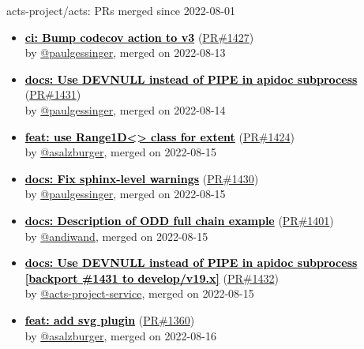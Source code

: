 \documentclass{beamer}
\begin{document}
\begin{frame}[allowframebreaks]{ acts-project/acts: PRs merged since 2022-08-01 }
\begin{itemize}
    \item
    \textbf{\href{https://github.com/acts-project/acts/pull/1427}{\textcolor{black}{ci: Bump codecov action to v3}}}
    (\href{https://github.com/acts-project/acts/pull/1427}{PR\#1427}) \\
    by \href{https://github.com/paulgessinger}{ @paulgessinger}, merged on 2022-08-13

    \item
    \textbf{\href{https://github.com/acts-project/acts/pull/1431}{\textcolor{black}{docs: Use DEVNULL instead of PIPE in apidoc subprocess}}}
    (\href{https://github.com/acts-project/acts/pull/1431}{PR\#1431}) \\
    by \href{https://github.com/paulgessinger}{ @paulgessinger}, merged on 2022-08-14

    \item
    \textbf{\href{https://github.com/acts-project/acts/pull/1424}{\textcolor{black}{feat: use Range1D<> class for extent}}}
    (\href{https://github.com/acts-project/acts/pull/1424}{PR\#1424}) \\
    by \href{https://github.com/asalzburger}{ @asalzburger}, merged on 2022-08-15

    \item
    \textbf{\href{https://github.com/acts-project/acts/pull/1430}{\textcolor{black}{docs: Fix sphinx-level warnings}}}
    (\href{https://github.com/acts-project/acts/pull/1430}{PR\#1430}) \\
    by \href{https://github.com/paulgessinger}{ @paulgessinger}, merged on 2022-08-15

    \item
    \textbf{\href{https://github.com/acts-project/acts/pull/1401}{\textcolor{black}{docs: Description of ODD full chain example}}}
    (\href{https://github.com/acts-project/acts/pull/1401}{PR\#1401}) \\
    by \href{https://github.com/andiwand}{ @andiwand}, merged on 2022-08-15

    \item
    \textbf{\href{https://github.com/acts-project/acts/pull/1432}{\textcolor{black}{docs: Use DEVNULL instead of PIPE in apidoc subprocess [backport \#1431 to develop/v19.x]}}}
    (\href{https://github.com/acts-project/acts/pull/1432}{PR\#1432}) \\
    by \href{https://github.com/acts-project-service}{ @acts-project-service}, merged on 2022-08-15

    \item
    \textbf{\href{https://github.com/acts-project/acts/pull/1360}{\textcolor{black}{feat: add svg plugin}}}
    (\href{https://github.com/acts-project/acts/pull/1360}{PR\#1360}) \\
    by \href{https://github.com/asalzburger}{ @asalzburger}, merged on 2022-08-16


\end{itemize}
\end{frame}
\end{document}
